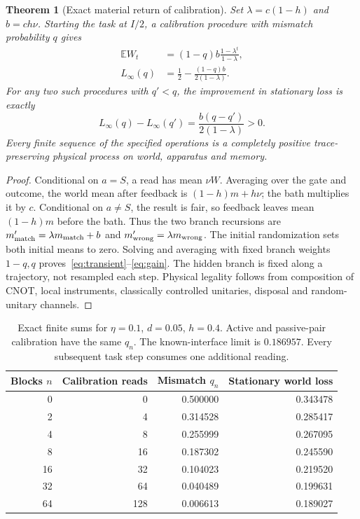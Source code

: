 \documentclass[11pt,a4paper]{article}
\newtheorem{theorem}[proposition]{Theorem}
\newcommand{\E}{\mathbb E}
\begin{document}
\begin{theorem}[Exact material return of calibration]\label{thm:return}
Set $\lambda=c(1-h)$ and $b=ch\nu$. Starting the task at $I/2$, a calibration procedure with mismatch probability $q$ gives
\begin{align}
 \E W_t&=(1-q)b\frac{1-\lambda^t}{1-\lambda},\label{eq:transient}\\
 L_\infty(q)&=\frac12-\frac{(1-q)b}{2(1-\lambda)}.\label{eq:steady}
\end{align}
For any two such procedures with $q'<q$, the improvement in stationary loss is exactly
\begin{equation}\label{eq:gain}
 L_\infty(q)-L_\infty(q')=
 \frac{b(q-q')}{2(1-\lambda)}>0.
\end{equation}
Every finite sequence of the specified operations is a completely positive trace-preserving physical process on world, apparatus and memory.
\end{theorem}
\begin{proof}
Conditional on $a=S$, a read has mean $\nu W$. Averaging over the gate and outcome, the world mean after feedback is $(1-h)m+h\nu$; the bath multiplies it by $c$. Conditional on $a\ne S$, the result is fair, so feedback leaves mean $(1-h)m$ before the bath. Thus the two branch recursions are $m'_{\rm match}=\lambda m_{\rm match}+b$ and $m'_{\rm wrong}=\lambda m_{\rm wrong}$. The initial randomization sets both initial means to zero. Solving and averaging with fixed branch weights $1-q,q$ proves~\eqref{eq:transient}--\eqref{eq:gain}. The hidden branch is fixed along a trajectory, not resampled each step. Physical legality follows from composition of CNOT, local instruments, classically controlled unitaries, disposal and random-unitary channels.
\end{proof}

\begin{table}[ht]
\centering
\begin{tabular}{rrrr}
\toprule
Blocks $n$ & Calibration reads & Mismatch $q_n$ & Stationary world loss\\
\midrule
0 & 0 & 0.500000 & 0.343478\\
2 & 4 & 0.314528 & 0.285417\\
4 & 8 & 0.255999 & 0.267095\\
8 & 16 & 0.187302 & 0.245590\\
16 & 32 & 0.104023 & 0.219520\\
32 & 64 & 0.040489 & 0.199631\\
64 & 128 & 0.006613 & 0.189027\\
\bottomrule
\end{tabular}
\caption{Exact finite sums for $\eta=0.1$, $d=0.05$, $h=0.4$. Active and passive-pair calibration have the same $q_n$. The known-interface limit is $0.186957$. Every subsequent task step consumes one additional reading.}
\label{tab:chain}
\end{table}
\end{document}
